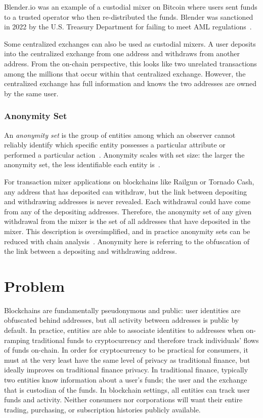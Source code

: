 \documentclass[9pt]{extreport}
\begin{document}
Blender.io was an example of a custodial mixer on Bitcoin where users sent funds to a trusted operator who then re-distributed the funds.  Blender was sanctioned in 2022 by the U.S. Treasury Department for failing to meet AML regulations~\cite{sun2022blender}.

Some centralized exchanges can also be used as custodial mixers.  A user deposits into the centralized exchange from one address and withdraws from another address.  From the on-chain perspective, this looks like two unrelated transactions among the millions that occur within that centralized exchange. However, the centralized exchange has full information and knows the two addresses are owned by the same user.

\subsection{Anonymity Set}
An \textit{anonymity set} is the group of entities among which an observer cannot reliably identify which specific entity possesses a particular attribute or performed a particular action~\cite{anonterminology,anonset}.  Anonymity scales with set size: the larger the anonymity set, the less identifiable each entity is~\cite{Dingledine2006AnonymityLC}.

For transaction mixer applications on blockchains like Railgun or Tornado Cash, any address that has deposited can withdraw, but the link between depositing and withdrawing addresses is never revealed.  Each withdrawal could have come from any of the depositing addresses.  Therefore, the anonymity set of any given withdrawal from the mixer is the set of all addresses that have deposited in the mixer.  This description is oversimplified, and in practice anonymity sets can be reduced with chain analysis~\cite{zcashanalysis,moneroanalysis}.  Anonymity here is referring to the obfuscation of the link between a depositing and withdrawing address.

\chapter{Problem} 
Blockchains are fundamentally pseudonymous and public: user identities are obfuscated behind addresses, but all activity between addresses is public by default.  In practice, entities are able to associate identities to addresses when on-ramping traditional funds to cryptocurrency and therefore track individuals' flows of funds on-chain.  In order for cryptocurrency to be practical for consumers, it must at the very least have the same level of privacy as traditional finance, but ideally improves on traditional finance privacy.  In traditional finance, typically two entities know information about a user's funds; the user and the exchange that is custodian of the funds.  In blockchain settings, all entities can track user funds and activity.  Neither consumers nor corporations will want their entire trading, purchasing, or subscription histories publicly available.
\end{document}
